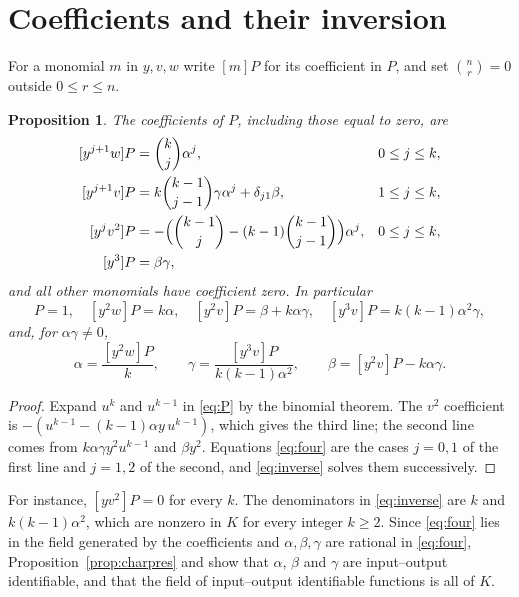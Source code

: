 \documentclass[10pt,a4paper]{article}
\newtheorem{proposition}[theorem]{Proposition}
\theoremstyle{definition}
\theoremstyle{remark}
\newcommand{\coef}[1]{[#1]P}
\begin{document}
\section{Coefficients and their inversion}
\label{sec:coef}
For a monomial $m$ in $y,v,w$ write $\coef{m}$ for its coefficient in
$P$, and set $\binom nr=0$ outside $0\leq r\leq n$.

\begin{proposition}
\label{prop:coef}
The coefficients of $P$, including those equal to zero, are
\begin{equation}
\begin{aligned}
 \coef{y^{j+1}w}&=\binom kj\alpha^j, && 0\leq j\leq k,\\
 \coef{y^{j+1}v}&=k\binom{k-1}{j-1}\gamma\alpha^j+\delta_{j1}\beta,
   && 1\leq j\leq k,\\
 \coef{y^{j}v^2}&=-\Bigl(\binom{k-1}{j}-(k-1)\binom{k-1}{j-1}\Bigr)\alpha^j,
   && 0\leq j\leq k,\\
 \coef{y^3}&=\beta\gamma,
\end{aligned}
\label{eq:table}
\end{equation}
and all other monomials have coefficient zero. In particular
\begin{equation}
 \coef{yw}=1,\quad \coef{y^2w}=k\alpha,\quad
 \coef{y^2v}=\beta+k\alpha\gamma,\quad
 \coef{y^3v}=k(k-1)\alpha^2\gamma,
 \label{eq:four}
\end{equation}
and, for $\alpha\gamma\neq0$,
\begin{equation}
 \alpha=\frac{\coef{y^2w}}{k},\qquad
 \gamma=\frac{\coef{y^3v}}{k(k-1)\alpha^2},\qquad
 \beta=\coef{y^2v}-k\alpha\gamma .
 \label{eq:inverse}
\end{equation}
\end{proposition}

\begin{proof}
Expand $u^k$ and $u^{k-1}$ in \eqref{eq:P} by the binomial theorem. The
$v^2$ coefficient is $-(u^{k-1}-(k-1)\alpha y\,u^{k-1})$, which gives the
third line; the second line comes from $k\alpha\gamma y^2u^{k-1}$ and
$\beta y^2$. Equations \eqref{eq:four} are the cases $j=0,1$ of the first
line and $j=1,2$ of the second, and \eqref{eq:inverse} solves them
successively.
\end{proof}

For instance, $\coef{yv^2}=0$ for every $k$. The denominators in
\eqref{eq:inverse} are $k$ and $k(k-1)\alpha^2$, which are nonzero in $K$
for every integer $k\geq2$. Since \eqref{eq:four} lies in the field
generated by the coefficients and $\alpha,\beta,\gamma$ are rational in
\eqref{eq:four}, Proposition~\ref{prop:charpres} and
\cite[Corollary~5.7]{OPT} show that $\alpha$, $\beta$ and $\gamma$ are
input--output identifiable, and that the field of input--output
identifiable functions is all of $K$.
\end{document}
